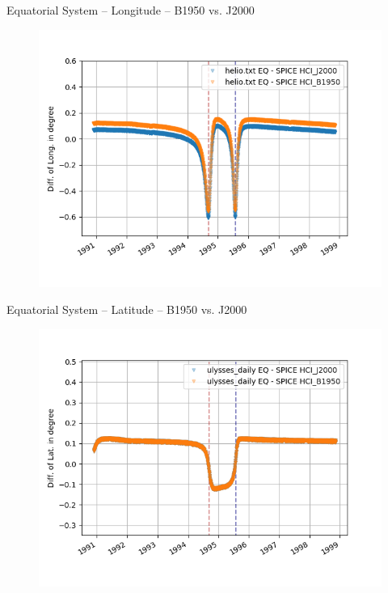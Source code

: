 \documentclass{beamer}
\begin{document}
\begin{frame}{Equatorial System -- Longitude -- B1950 vs. J2000}
\begin{figure}									
	\includegraphics[width=1\textwidth]{Pics/EQ_LONG_J_B.png}
\end{figure}
\end{frame}

\begin{frame}{Equatorial System -- Latitude --  B1950 vs. J2000}
\begin{figure}									
	\includegraphics[width=1\textwidth]{Pics/EQ_LAT_J_B.png}
\end{figure}
\end{frame}
\end{document}
